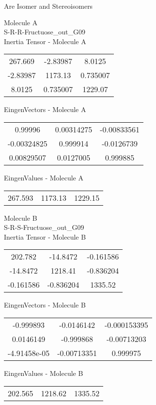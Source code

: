 \begin{center}
\vtab
\vtab
\textcolor{NavyBlue}{\Large Are Isomer and Stereoisomers}
\end{center}
\newpage
\begin{multicols}{2}
\begin{center}
Molecule A \\ 
S-R-R-Fructuose\_out\_G09
\\
Inertia Tensor - Molecule A \\
\vtab
\begin{tabular}{|c c c|}
267.669	 & 	-2.83987	 & 	8.0125	 \\
-2.83987	 & 	1173.13	 & 	0.735007	 \\
8.0125	 & 	0.735007	 & 	1229.07
\end{tabular}

\vtab
 EingenVectors - Molecule A     \\
\vtab
\begin{tabular}{|c c c|}
0.99996	 & 	0.00314275	 & 	-0.00833561	 \\
-0.00324825	 & 	0.999914	 & 	-0.0126739	 \\
0.00829507	 & 	0.0127005	 & 	0.999885
\end{tabular}

\vtab
 EingenValues - Molecule A     \\
\vtab
\begin{tabular}{|c c c|}
267.593	 & 	1173.13	 & 	1229.15
\end{tabular}
\columnbreak

Molecule B \\ 
S-R-S-Fructuose\_out\_G09
\\
Inertia Tensor - Molecule B \\
\vtab
\begin{tabular}{|c c c|}
202.782	 & 	-14.8472	 & 	-0.161586	 \\
-14.8472	 & 	1218.41	 & 	-0.836204	 \\
-0.161586	 & 	-0.836204	 & 	1335.52
\end{tabular}

\vtab
 EingenVectors - Molecule B     \\
\vtab
\begin{tabular}{|c c c|}
-0.999893	 & 	-0.0146142	 & 	-0.000153395	 \\
0.0146149	 & 	-0.999868	 & 	-0.00713203	 \\
-4.91458e-05	 & 	-0.00713351	 & 	0.999975
\end{tabular}

\vtab
 EingenValues - Molecule B     \\
\vtab
\begin{tabular}{|c c c|}
202.565	 & 	1218.62	 & 	1335.52
\end{tabular}

\end{center}
\end{multicols}
